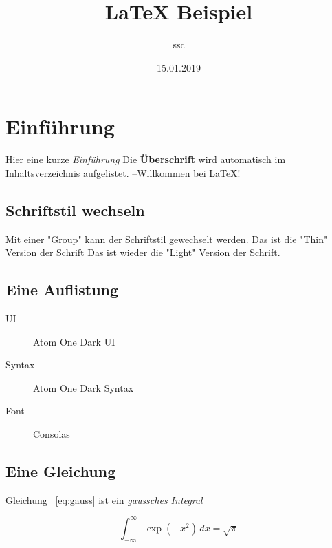 \documentclass[a4paper]{article}
\title{LaTeX Beispiel}
\author{ssc}
\date{15.01.2019}
\begin{document}
\maketitle
\tableofcontents

\section{Einführung}
  Hier eine kurze \textit{Einführung}
  Die \textbf{Überschrift} wird automatisch im Inhaltsverzeichnis
  aufgelistet.
  --Willkommen bei \LaTeX{}!

\subsection{Schriftstil wechseln}
  Mit einer "Group" kann der Schriftstil gewechselt werden. \newline
  \begingroup
  \selectfont
  Das ist die "Thin" Version der Schrift \newline
  \endgroup
  Das ist wieder die "Light" Version der Schrift.

\subsection{Eine Auflistung}
    \begin{description}
        \item [UI]      Atom One Dark UI
        \item [Syntax]  Atom One Dark Syntax
        \item [Font]    Consolas
    \end{description} 

\subsection{Eine Gleichung}
  Gleichung ~\eqref{eq:gauss} ist ein \emph{gaussches Integral}

    \begin{equation}
        \int_{-\infty}^{\infty}\exp(-x^2)\,dx = \sqrt{\pi} \label{eq:gauss}
    \end{equation}
\end{document}
